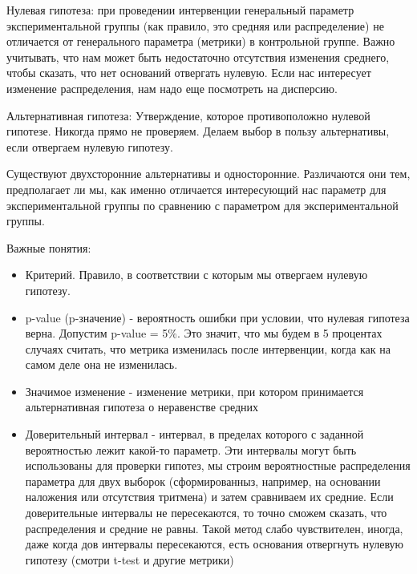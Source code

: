 Нулевая гипотеза: при проведении интервенции генеральный параметр экспериментальной группы (как правило, это средняя или распределение) не отличается от генерального параметра (метрики) в контрольной группе. Важно учитывать, что нам может быть недостаточно отсутствия изменения среднего, чтобы сказать, что нет оснований отвергать нулевую. Если нас интересует изменение распределения, нам надо еще посмотреть на дисперсию. 

Альтернативная гипотеза: Утверждение, которое противоположно нулевой гипотезе. Никогда прямо не проверяем. Делаем выбор в пользу альтернативы, если отвергаем нулевую гипотезу. 

Существуют двухсторонние альтернативы и односторонние. Различаются они тем, предполагает ли мы, как именно отличается интересующий нас параметр для экспериментальной группы по сравнению с параметром для экспериментальной группы. 

Важные понятия:

\begin{itemize}
    \item Критерий. Правило, в соответствии с которым мы отвергаем нулевую гипотезу. 
    \item p-value (p-значение) - вероятность ошибки при условии, что нулевая гипотеза верна. Допустим p-value = 5\%. Это значит, что мы будем в 5 процентах случаях считать, что метрика изменилась после интервенции, когда как на самом деле она не изменилась. 
    
    \item Значимое изменение - изменение метрики, при котором принимается альтернативная гипотеза о неравенстве средних
    \item Доверительный интервал - интервал, в пределах которого с заданной вероятностью лежит какой-то параметр. Эти интервалы могут быть использованы для проверки гипотез, мы строим вероятностные распределения параметра для двух выборок (сформированныз, например, на основании наложения или отсутствия тритмена) и затем сравниваем их средние. Если доверительные интервалы не пересекаются, то точно сможем сказать, что распределения и средние не равны. Такой метод слабо чувствителен, иногда, даже когда дов интервалы пересекаются, есть основания отвергнуть нулевую гипотезу (смотри t-test и другие метрики) 
\end{itemize}
